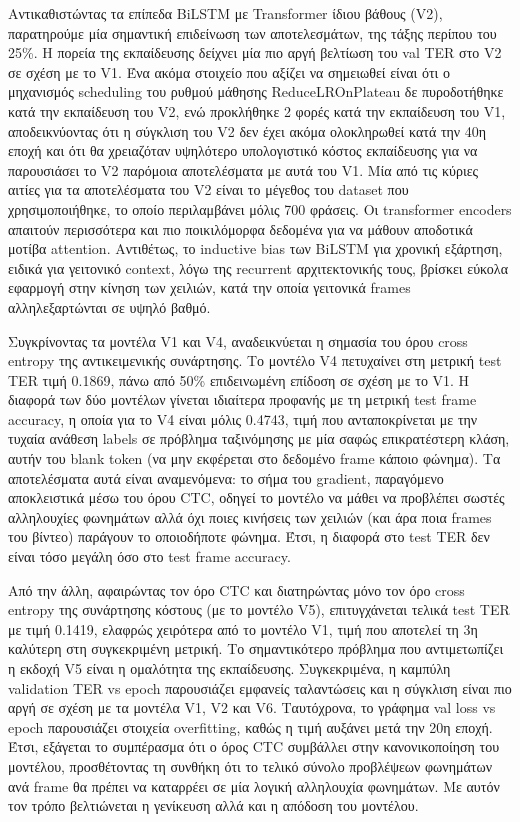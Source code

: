 Αντικαθιστώντας τα επίπεδα BiLSTM με Transformer ίδιου βάθους (V2), παρατηρούμε μία σημαντική επιδείνωση των αποτελεσμάτων, της τάξης περίπου του 25\%. Η πορεία της εκπαίδευσης δείχνει μία πιο αργή βελτίωση του val TER στο V2 σε σχέση με το V1. Ένα ακόμα στοιχείο που αξίζει να σημειωθεί είναι ότι ο μηχανισμός scheduling του ρυθμού μάθησης ReduceLROnPlateau δε πυροδοτήθηκε κατά την εκπαίδευση του V2, ενώ προκλήθηκε 2 φορές κατά την εκπαίδευση του V1, αποδεικνύοντας ότι η σύγκλιση του V2 δεν έχει ακόμα ολοκληρωθεί κατά την 40η εποχή και ότι θα χρειαζόταν υψηλότερο υπολογιστικό κόστος εκπαίδευσης για να παρουσιάσει το V2 παρόμοια αποτελέσματα με αυτά του V1. Μία από τις κύριες αιτίες για τα αποτελέσματα του V2 είναι το μέγεθος του dataset που χρησιμοποιήθηκε, το οποίο περιλαμβάνει μόλις 700 φράσεις. Οι transformer encoders απαιτούν περισσότερα και πιο ποικιλόμορφα δεδομένα για να μάθουν αποδοτικά μοτίβα attention. Αντιθέτως, το inductive bias των BiLSTM για χρονική εξάρτηση, ειδικά για γειτονικό context, λόγω της recurrent αρχιτεκτονικής τους, βρίσκει εύκολα εφαρμογή στην κίνηση των χειλιών, κατά την οποία γειτονικά frames αλληλεξαρτώνται σε υψηλό βαθμό.

Συγκρίνοντας τα μοντέλα V1 και V4, αναδεικνύεται η σημασία του όρου cross entropy της αντικειμενικής συνάρτησης. Το μοντέλο V4 πετυχαίνει στη μετρική test TER τιμή 0.1869, πάνω από 50\% επιδεινωμένη επίδοση σε σχέση με το V1. Η διαφορά των δύο μοντέλων γίνεται ιδιαίτερα προφανής με τη μετρική test frame accuracy, η οποία για το V4 είναι μόλις 0.4743, τιμή που ανταποκρίνεται με την τυχαία ανάθεση labels σε πρόβλημα ταξινόμησης με μία σαφώς επικρατέστερη κλάση, αυτήν του blank token (να μην εκφέρεται στο δεδομένο frame κάποιο φώνημα). Τα αποτελέσματα αυτά είναι αναμενόμενα: το σήμα του gradient, παραγόμενο αποκλειστικά μέσω του όρου CTC, οδηγεί το μοντέλο να μάθει να προβλέπει σωστές αλληλουχίες φωνημάτων αλλά όχι ποιες κινήσεις των χειλιών (και άρα ποια frames του βίντεο) παράγουν το οποιοδήποτε φώνημα. Έτσι, η διαφορά στο test TER δεν είναι τόσο μεγάλη όσο στο test frame accuracy.

Από την άλλη, αφαιρώντας τον όρο CTC και διατηρώντας μόνο τον όρο cross entropy της συνάρτησης κόστους (με το μοντέλο V5), επιτυγχάνεται τελικά test TER με τιμή 0.1419, ελαφρώς χειρότερα από το μοντέλο V1, τιμή που αποτελεί τη 3η καλύτερη στη συγκεκριμένη μετρική. Το σημαντικότερο πρόβλημα που αντιμετωπίζει η εκδοχή V5 είναι η ομαλότητα της εκπαίδευσης. Συγκεκριμένα, η καμπύλη validation TER vs epoch παρουσιάζει εμφανείς ταλαντώσεις και η σύγκλιση είναι πιο αργή σε σχέση με τα μοντέλα V1, V2 και V6. Ταυτόχρονα, το γράφημα val loss vs epoch παρουσιάζει στοιχεία overfitting, καθώς η τιμή αυξάνει μετά την 20η εποχή. Έτσι, εξάγεται το συμπέρασμα ότι ο όρος CTC συμβάλλει στην κανονικοποίηση του μοντέλου, προσθέτοντας τη συνθήκη ότι το τελικό σύνολο προβλέψεων φωνημάτων ανά frame θα πρέπει να καταρρέει σε μία λογική αλληλουχία φωνημάτων. Με αυτόν τον τρόπο βελτιώνεται η γενίκευση αλλά και η απόδοση του μοντέλου.

